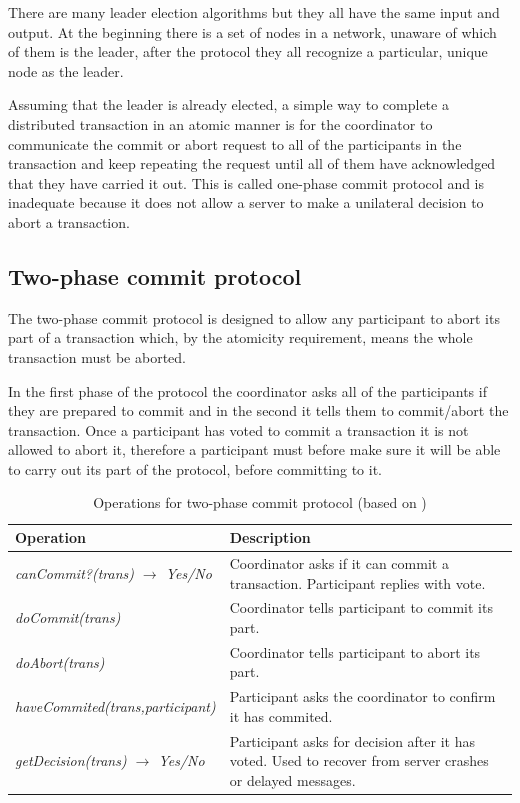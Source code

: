 There are many leader election algorithms but they all have the same input and output. At the beginning there is a set of nodes in a network, unaware of which of them is the leader, after the protocol they all recognize a particular, unique node as the leader.

Assuming that the leader is already elected, a simple way to complete a distributed transaction in an atomic manner is for the coordinator to communicate the commit or abort request to all of the participants in the transaction and keep repeating the request until all of them have acknowledged that they have carried it out. This is called one-phase commit protocol\cite{coulouris2005distributed} and is inadequate because it does not allow a server to make a unilateral decision to abort a transaction. 

\subsection{Two-phase commit protocol}

The two-phase commit protocol is designed to allow any participant to abort its part of a transaction which, by the atomicity requirement, means the whole transaction must be aborted. 

In the first phase of the protocol the coordinator asks all of the participants if they are prepared to commit and in the second it tells them to commit/abort the transaction. Once a participant has voted to commit a transaction it is not allowed to abort it, therefore a participant must before make sure it will be able to carry out its part of the protocol, before committing to it. 

\begin{table}[h!]
\centering
  \begin{tabular}{  l | p{8cm}}
	Operation & Description\\
    \hline  \hline
    \emph{canCommit?(trans) $\rightarrow$ Yes/No} & Coordinator asks if it can commit a transaction. Participant replies with vote.\\
    \hline
    \emph{doCommit(trans)} & Coordinator tells participant to commit its part.\\
    \hline
    \emph{doAbort(trans)} & Coordinator tells participant to abort its part.\\
    \hline
    \emph{haveCommited(trans,participant)} & Participant asks the coordinator to confirm it has commited.\\
    \hline
    \emph{getDecision(trans) $\rightarrow$ Yes/No} & Participant asks for decision after it has voted. Used to recover from server crashes or delayed messages.
  \end{tabular}

\caption{Operations for two-phase commit protocol (based on \cite{coulouris2005distributed})}
\label{tab:2pc_ops}
\end{table}

